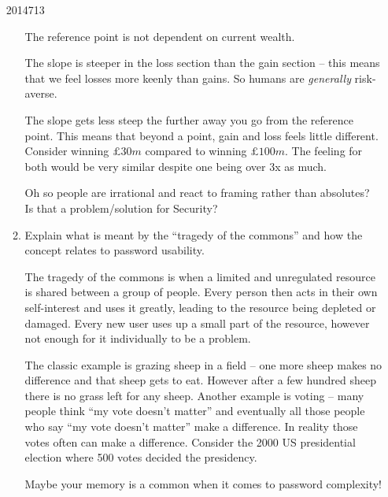 \documentclass[10pt,\jkfside,a4paper]{article}
\begin{document}
\begin{enumerate}
\begin{examquestion}{2014}{7}{13}
\begin{enumerate}[label=(\alph*)]
The reference point is not dependent on current wealth.

The slope is steeper in the loss section than the gain section -- this means
that we feel losses more keenly than gains. So humans are \textit{generally}
risk-averse.

The slope gets less steep the further away you go from the reference point.
This means that beyond a point, gain and loss feels little different.
Consider winning $\pounds 30m$ compared to winning $\pounds 100m$.
The feeling for both would be very similar despite one being over 3x as much.

{\color{blue}
Oh so people are irrational and react to framing rather than absolutes?\\
Is that a problem/solution for Security?
}

\item Explain what is meant by the ``tragedy of the commons'' and how the concept 
relates to password usability.

The tragedy of the commons is when a limited and unregulated resource is shared between a group of people.
Every person then acts in their own self-interest and uses it greatly, leading to the resource being depleted or
damaged. Every new user uses up a small part of the resource, however not enough for it individually to be a problem.

The classic example is grazing sheep in a field -- one more sheep makes no difference and that
sheep gets to eat. However after a few hundred sheep there is no grass left for any sheep. Another example is
voting -- many people think ``my vote doesn't matter'' and eventually all those people who say ``my vote doesn't
matter'' make a difference. In reality those votes often can make a difference. Consider the 2000 US presidential
election where 500 votes decided the presidency.

{\color{blue}
Maybe your memory is a common when it comes to password complexity!
}





\end{enumerate}
\end{examquestion}
\end{enumerate}
\end{document}

